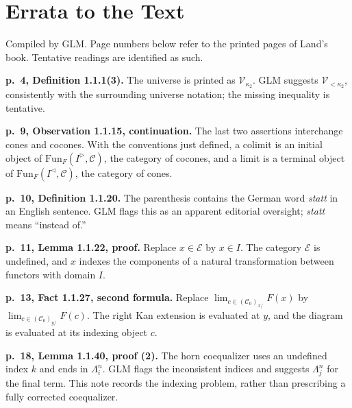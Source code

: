\chapter{Errata to the Text}
\label{app:text-errata}
Compiled by GLM. Page numbers below refer to the printed pages of Land's book.
Tentative readings are identified as such.

\par{}
\noindent\textbf{p.~4, Definition 1.1.1(3).}\enspace
The universe is printed as $\mathcal V_{\kappa_2}$. GLM suggests $\mathcal V_{<\kappa_2}$, consistently with the surrounding universe notation; the missing inequality is tentative.

\par{}
\noindent\textbf{p.~9, Observation 1.1.15, continuation.}\enspace
The last two assertions interchange cones and cocones. With the conventions just defined, a colimit is an initial object of $\mathrm{Fun}_F(I^{\rhd},\mathcal C)$, the category of cocones, and a limit is a terminal object of $\mathrm{Fun}_F(I^{\lhd},\mathcal C)$, the category of cones.

\par{}
\noindent\textbf{p.~10, Definition 1.1.20.}\enspace
The parenthesis contains the German word \emph{statt} in an English sentence. GLM flags this as an apparent editorial oversight; \emph{statt} means ``instead of.''

\par{}
\noindent\textbf{p.~11, Lemma 1.1.22, proof.}\enspace
Replace $x\in\mathcal E$ by $x\in I$. The category $\mathcal E$ is undefined, and $x$ indexes the components of a natural transformation between functors with domain $I$.

\par{}
\noindent\textbf{p.~13, Fact 1.1.27, second formula.}\enspace
Replace $\lim_{c\in(\mathcal C_0)_{x/}}F(x)$ by $\lim_{c\in(\mathcal C_0)_{y/}}F(c)$. The right Kan extension is evaluated at $y$, and the diagram is evaluated at its indexing object $c$.

\par{}
\noindent\textbf{p.~18, Lemma 1.1.40, proof (2).}\enspace
The horn coequalizer uses an undefined index $k$ and ends in $\Lambda_i^n$. GLM flags the inconsistent indices and suggests $\Lambda_j^n$ for the final term. This note records the indexing problem, rather than prescribing a fully corrected coequalizer.

